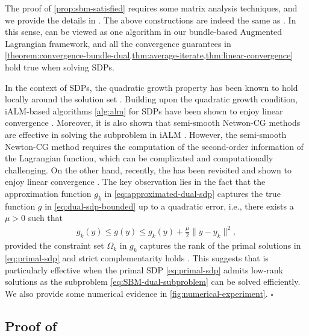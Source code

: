 \documentclass[11pt]{article}
\begin{document}
The proof of \cref{prop:sbm-satisfied} requires some matrix analysis techniques, and we provide the details in .  
%
The above constructions are indeed the same as \SBM{}. In this sense, \SBM{} can be viewed as one algorithm in our bundle-based Augmented Lagrangian framework, and all the convergence guarantees in \cref{theorem:convergence-bundle-dual,thm:average-iterate,thm:linear-convergence} hold true when solving SDPs. 



\begin{remark}
    In the context of SDPs, the quadratic growth property has been known to hold locally around the solution set \cite{cui2016asymptotic,cui2017quadratic,ding2023revisiting,liao2024inexact}. Building upon the quadratic growth condition, iALM-based algorithms \cref{alg:alm} for SDPs have been shown to enjoy linear convergence \cite{cui2019r,yang2015sdpnal+}. Moreover, it is also shown that semi-smooth Netwon-CG methods are effective in solving the subproblem in iALM \cite{yang2015sdpnal+}. However, the semi-smooth Newton-CG method requires the computation of the second-order information of the Lagrangian function, which can be complicated and computationally challenging. On the other hand, recently, the \SBM{} has been revisited and shown to enjoy linear convergence \cite{ding2023revisiting,liao2023overview}. The key observation lies in the fact that the approximation function $g_k$ in \eqref{eq:approximated-dual-sdp} captures the true function $g$ in \eqref{eq:dual-sdp-bounded} up to a quadratic error, i.e., there exists a $\mu > 0$ such that  
    \begin{align*}
        g_k(y)\leq g(y) \leq g_k(y) + \frac{\mu}{2} \|y -y_k\|^2,
    \end{align*}
    provided the constraint set $\Omega_k$ in $g_k$ captures the rank of the primal solutions in \cref{eq:primal-sdp} and strict complementarity holds \cite{ding2023revisiting}. This suggests that \SBM{} is particularly effective when the primal SDP \cref{eq:primal-sdp} admits low-rank solutions as the subproblem \eqref{eq:SBM-dual-subproblem} can be solved efficiently. We also provide some numerical evidence in \cref{fig:numerical-experiment}. \hfill $\square$
\end{remark}

\subsection{Proof of } \label{appendix:SDP-proof}
\end{document}
